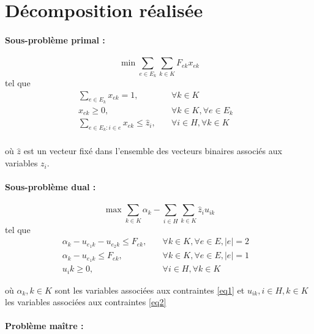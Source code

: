 \section{Décomposition réalisée}

\paragraph{Sous-problème primal :}

\[ \min \sum_{e \in E_k}\sum_{k \in K}F_{ek}x_{ek}\]
tel que
\begin{subequations}
    \begin{align}
        \sum_{e \in E_k}x_{ek} = 1, \quad &\forall{k\in K}&\\
        x_{ek} \ge 0, \quad &\forall{k \in K}, \forall{e \in E_k} \label{eq1}&\\
        \sum_{e \in E_k:i\in e}x_{ek} \le \hat{z}_i,\quad &\forall{i \in H}, \forall{k\in K}\label{eq2}&\\
    \end{align}
\end{subequations}

où $\hat{z}$ est un vecteur fixé dans l'ensemble des vecteurs binaires associés aux variables $z_i$.

\smallskip

\paragraph{Sous-problème dual : }

\[ \max \sum_{k \in K}\alpha_k - \sum_{i \in H}\sum_{k \in K} \hat{z}_iu_{ik}\]
tel que
\begin{subequations}
    \begin{align}
        \alpha_k - u_{e_1k} - u_{e_2k} \le F_{ek}, \quad &\forall{k\in K}, \forall{e \in E}, |e| = 2&\\
        \alpha_k - u_{e_1k} \le F_{ek}, \quad &\forall{k\in K}, \forall{e \in E}, |e| = 1&\\
        u_ik \ge 0, \quad &\forall{i \in H}, \forall{k \in K}
    \end{align}
\end{subequations}

où $\alpha_k, k\in K$ sont les variables associées aux contraintes \ref{eq1} et $u_{ik}, i \in H, k \in K$ les variables associées aux contraintes \ref{eq2}

\smallskip
\paragraph{Problème maître :}


